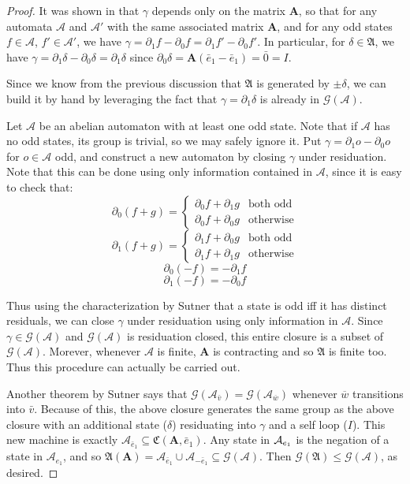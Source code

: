 \documentclass[final]{ws-ijac}
\newcommand{\A}{\mathcal{A}}
\newcommand{\G}{\mathcal{G}}
\renewcommand{\P}{\mathfrak{A}}
\newcommand{\2}{\textbf{2}}
\newcommand{\Am}{\textbf{A}}
\newcommand{\del}{\partial}
\newcommand{\vv}{\bar{v}}
\newcommand{\e}{\bar{e}}
\begin{document}
\begin{proof}
  It was shown in \cite{Sutner18:abelian_automata} that $\gamma$ depends
  only on the matrix $\Am$, so that for any automata $\A$ and $\A'$ with the same
  associated matrix $\Am$, and for any odd states $f \in \A$, $f' \in \A'$, 
  we have $\gamma = \del_1 f - \del_0 f = \del_1 f' - \del_0 f'$. 
  In particular, for $\delta \in \P$, we have 
  $\gamma = \del_1 \delta - \del_0 \delta = \del_1 \delta$ since
  $\del_0 \delta = \Am(\e_1 - \e_1) = \bar{0} = I$. 

  Since we know from the previous discussion that $\P$ is generated by
  $\pm \delta$, we can build it by hand by leveraging the fact that 
  $\gamma = \del_1 \delta$ is already in $\G(\A)$.

  Let $\A$ be an abelian automaton with at least one odd state.
  Note that if $\A$ has no odd states, its group is trivial, so we may
  safely ignore it.
  Put $\gamma = \del_1 o - \del_0 o$ for $o \in \A$ odd, and construct
  a new automaton by closing $\gamma$ under residuation.
  Note that this can be done using only information contained in $\A$,
  since it is easy to check that:
  \[
    \del_0(f + g) = \begin{cases} \del_0 f + \del_1 g & \text{both odd}\\
                                  \del_0 f + \del_0 g & \text{otherwise}
                    \end{cases}
  \]
  \[
    \del_1(f + g) = \begin{cases} \del_1 f + \del_0 g & \text{both odd}\\
                                  \del_1 f + \del_1 g & \text{otherwise}
                    \end{cases}
  \]
  \[
    \del_0 (-f) = - \del_1 f
  \]
  \[
    \del_1 (-f) = - \del_0 f
  \]

  Thus using the characterization by Sutner \cite{Sutner18:abelian_automata}
  that a state is odd iff it has distinct residuals, we can close $\gamma$ 
  under residuation using only information in $\A$.
  Since $\gamma \in \G(\A)$ and $\G(\A)$ is residuation closed, 
  this entire closure is a subset of $\G(\A)$. Morever, whenever $\A$ is 
  finite, $\Am$ is contracting and so $\P$ is finite too. Thus this 
  procedure can actually be carried out.

  Another theorem by Sutner \cite{Sutner18:abelian_automata} says that 
  $\G(\A_{\vv}) = \G(\A_{\overline{w}})$ whenever $\overline{w}$ transitions 
  into $\vv$. Because of this, the above closure generates the same group
  as the above closure with an additional state ($\delta$) residuating into 
  $\gamma$ and a self loop ($I$). This new machine is exactly
  $\A_{\e_1} \subseteq \mathfrak{C}(\Am,\e_1)$. Any state in $\A_{\-e_1}$ is
  the negation of a state in $\A_{e_1}$, and so 
  $\P(\Am) = \A_{\e_1} \cup \A_{-\e_1} \subseteq \G(\A)$. 
  Then $\G(\P) \leq \G(\A)$, as desired.
\end{proof}
\end{document}
